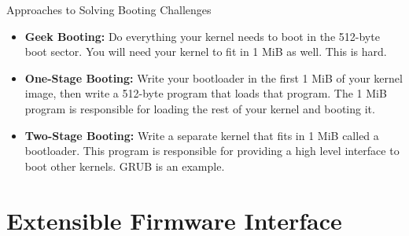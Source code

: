 \documentclass{lug}
\begin{document}
\begin{frame}{Approaches to Solving Booting Challenges}
    \begin{itemize}[<+->]
        \item \textbf{Geek Booting:} Do everything your kernel needs to boot in
            the 512-byte boot sector. You will need your kernel to fit in 1 MiB
            as well. This is hard.
        \item \textbf{One-Stage Booting:} Write your bootloader in the first 1
            MiB of your kernel image, then write a 512-byte program that loads
            that program. The 1 MiB program is responsible for loading the rest
            of your kernel and booting it.
        \item \textbf{Two-Stage Booting:} Write a separate kernel that fits in
            1 MiB called a bootloader. This program is responsible for
            providing a high level interface to boot other kernels. GRUB is an
            example.
    \end{itemize}
\end{frame}

\section{Extensible Firmware Interface}
\end{document}
